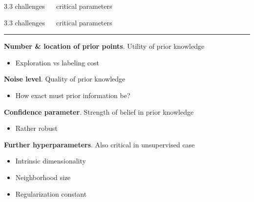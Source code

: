 \documentclass[11pt, compress, t, notes = noshow, xcolor = table, 
aspectratio = 1610]{beamer}
\newcommand{\maketag}[1]{\colorbox{highlightcol}{\textcolor{white}
{\MakeUppercase{#1}}}}
\newcommand{\highlight}[1]{\textcolor{highlightcol}{\textbf{#1}}}
\newcommand{\arritem}{\item[\highlight{$\rightarrow$}]}
\begin{document}
\begin{frame}{\textcolor{gray!90}{3.3 challenges} ~~ critical parameters}
% 
% 

\end{frame}


\LARGE
\begin{frame}{\textcolor{gray!90}{3.3 challenges} ~~ critical parameters}
\normalsize
\vspace{-0.5cm}
\noindent \textcolor{gray!90}{\rule{\textwidth}{1pt}}
\smallskip


\textbf{Number \& location of prior points}. Utility of prior knowledge ~ 
\maketag{analysis}

\begin{itemize}
  \arritem Exploration vs labeling cost
\end{itemize}

\textbf{Noise level}. Quality of prior knowledge ~ 
\maketag{analysis}

\begin{itemize}
  \arritem How exact must prior information be?
\end{itemize}

\textbf{Confidence parameter}. Strength of belief in prior knowledge 

\begin{itemize}
  \arritem Rather robust
\end{itemize}

% 

\vspace{0.3cm}

\textbf{Further hyperparameters}. Also critical in unsupervised case

\begin{itemize}
  \arritem Intrinsic dimensionality
  \arritem Neighborhood size
  \arritem Regularization constant
\end{itemize}
% 
% 
% 
% 
% 



\end{frame}
\end{document}
